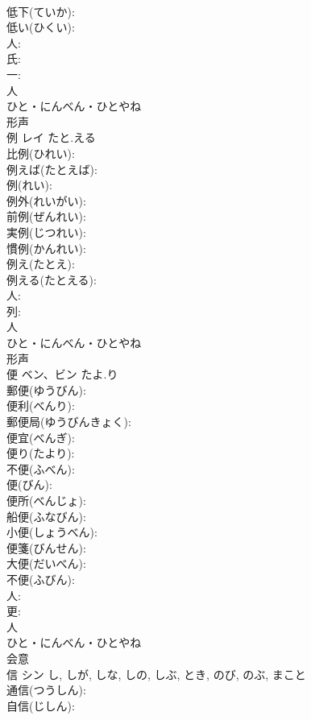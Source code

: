 \documentclass[8pt]{extreport}
\begin{document}
\begin{CJK}{UTF8}{min}
\\	低下(ていか): 
\\	低い(ひくい): 
\\	人: 
\\	氏: 
\\	一: 
\\	人	
\\	ひと・にんべん・ひとやね	
\\	形声 
\\	例	レイ	たと.える		
\\	比例(ひれい): 
\\	例えば(たとえば): 
\\	例(れい): 
\\	例外(れいがい): 
\\	前例(ぜんれい): 
\\	実例(じつれい): 
\\	慣例(かんれい): 
\\	例え(たとえ): 
\\	例える(たとえる): 
\\	人: 
\\	列: 
\\	人	
\\	ひと・にんべん・ひとやね	
\\	形声 
\\	便	ベン、ビン	たよ.り		
\\	郵便(ゆうびん): 
\\	便利(べんり): 
\\	郵便局(ゆうびんきょく): 
\\	便宜(べんぎ): 
\\	便り(たより): 
\\	不便(ふべん): 
\\	便(びん): 
\\	便所(べんじょ): 
\\	船便(ふなびん): 
\\	小便(しょうべん): 
\\	便箋(びんせん): 
\\	大便(だいべん): 
\\	不便(ふびん): 
\\	人: 
\\	更: 
\\	人	
\\	ひと・にんべん・ひとやね	
\\	会意 
\\	信	シン		し, しが, しな, しの, しぶ, とき, のび, のぶ, まこと	
\\	通信(つうしん): 
\\	自信(じしん): 

\end{CJK}
\end{document}

